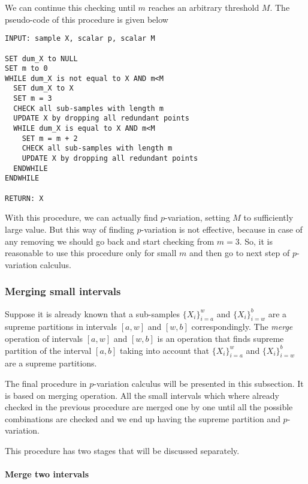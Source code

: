 \documentclass[12pt, a4paper]{article}
\numberwithin{equation}{section}
\begin{document}
We can continue this checking until $m$ 
reaches an arbitrary threshold $M$.
The  pseudo-code  of this procedure is given below
\begin{lstlisting}
INPUT: sample X, scalar p, scalar M

SET dum_X to NULL
SET m to 0
WHILE dum_X is not equal to X AND m<M
  SET dum_X	to X
  SET m = 3
  CHECK all sub-samples with length m 
  UPDATE X by dropping all redundant points
  WHILE dum_X is equal to X AND	m<M
    SET m = m + 2
    CHECK all sub-samples with length m
    UPDATE X by dropping all redundant points
  ENDWHILE  
ENDWHILE

RETURN: X
\end{lstlisting}


With this procedure, we can actually find 
$p$-variation, setting $M$ to sufficiently large value.
But this way of finding $p$-variation is not effective, 
because in case of any removing 
we should go back and start checking
from $m=3$.
So, it is reasonable to use this procedure
only for small $m$ and then go
to next step of $p$-variation calculus.





\subsubsection{Merging small intervals}
\label{sec:meging}

Suppose it is already known that 
a sub-samples $\{X_{i}\}_{i=a}^{w}$  and $\{X_{i}\}_{i=w}^{b}$
are a supreme partitions in intervals $[a,w]$ and $[w,b]$ correspondingly. 
The \emph{merge} operation of intervals $[a,w]$ and $[w,b]$ is
an operation that finds supreme partition 
of the interval $[a,b]$ taking into account
that  $\{X_{i}\}_{i=a}^{w}$  and $\{X_{i}\}_{i=w}^{b}$
are a supreme partitions.

The final procedure in $p$-variation calculus will be
presented in this subsection. It is based on
merging operation.
All the small intervals which where already checked in the 
previous procedure are merged one by one until all the
possible combinations are checked and we end up having
the supreme partition and $p$-variation.

This procedure has two stages that will be discussed separately.

\paragraph{Merge two intervals}
\end{document}
